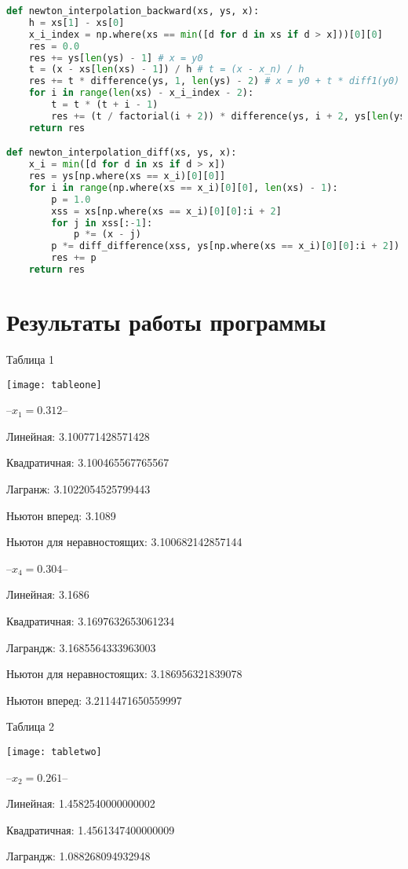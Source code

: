 \documentclass[12pt, a4paper]{article}
\begin{document}
\begin{lstlisting}[language = Python]
def newton_interpolation_backward(xs, ys, x):
    h = xs[1] - xs[0]
    x_i_index = np.where(xs == min([d for d in xs if d > x]))[0][0]
    res = 0.0
    res += ys[len(ys) - 1] # x = y0
    t = (x - xs[len(xs) - 1]) / h # t = (x - x_n) / h
    res += t * difference(ys, 1, len(ys) - 2) # x = y0 + t * diff1(y0)
    for i in range(len(xs) - x_i_index - 2):
        t = t * (t + i - 1)
        res += (t / factorial(i + 2)) * difference(ys, i + 2, ys[len(ys) - i + 2])
    return res

def newton_interpolation_diff(xs, ys, x):
    x_i = min([d for d in xs if d > x])
    res = ys[np.where(xs == x_i)[0][0]]
    for i in range(np.where(xs == x_i)[0][0], len(xs) - 1):
        p = 1.0
        xss = xs[np.where(xs == x_i)[0][0]:i + 2]
        for j in xss[:-1]:
            p *= (x - j)
        p *= diff_difference(xss, ys[np.where(xs == x_i)[0][0]:i + 2])
        res += p
    return res
\end{lstlisting}

\section*{Результаты работы программы}

Таблица 1

\texttt{[image: tableone]}

--$x_1 = 0.312$--

Линейная: 3.100771428571428

Квадратичная: 3.100465567765567

Лагранж: 3.1022054525799443

Ньютон вперед: 3.1089

Ньютон для неравностоящих: 3.100682142857144

--$x_4 = 0.304$--

Линейная: 3.1686

Квадратичная: 3.1697632653061234

Лаграндж: 3.1685564333963003

Ньютон для неравностоящих: 3.186956321839078

Ньютон вперед: 3.2114471650559997

Таблица 2

\texttt{[image: tabletwo]}

--$x_2 = 0.261$--

Линейная: 1.4582540000000002

Квадратичная: 1.4561347400000009

Лаграндж: 1.088268094932948
\end{document}
